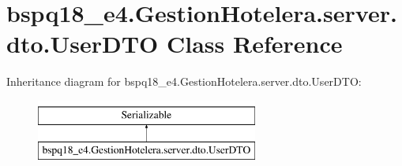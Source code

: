 \hypertarget{classbspq18__e4_1_1_gestion_hotelera_1_1server_1_1dto_1_1_user_d_t_o}{}\section{bspq18\+\_\+e4.\+Gestion\+Hotelera.\+server.\+dto.\+User\+D\+TO Class Reference}
\label{classbspq18__e4_1_1_gestion_hotelera_1_1server_1_1dto_1_1_user_d_t_o}
Inheritance diagram for bspq18\+\_\+e4.\+Gestion\+Hotelera.\+server.\+dto.\+User\+D\+TO\+:\begin{figure}[H]
\begin{center}
\leavevmode
\includegraphics[height=2.000000cm]{classbspq18__e4_1_1_gestion_hotelera_1_1server_1_1dto_1_1_user_d_t_o}
\end{center}
\end{figure}
